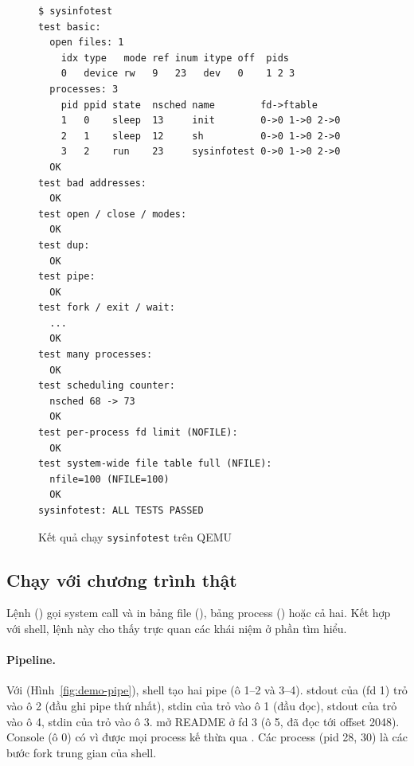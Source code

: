 \begin{figure}[H]
\begin{verbatim}
$ sysinfotest
test basic:
  open files: 1
    idx type   mode ref inum itype off  pids
    0   device rw   9   23   dev   0    1 2 3
  processes: 3
    pid ppid state  nsched name        fd->ftable
    1   0    sleep  13     init        0->0 1->0 2->0
    2   1    sleep  12     sh          0->0 1->0 2->0
    3   2    run    23     sysinfotest 0->0 1->0 2->0
  OK
test bad addresses:
  OK
test open / close / modes:
  OK
test dup:
  OK
test pipe:
  OK
test fork / exit / wait:
  ...
  OK
test many processes:
  OK
test scheduling counter:
  nsched 68 -> 73
  OK
test per-process fd limit (NOFILE):
  OK
test system-wide file table full (NFILE):
  nfile=100 (NFILE=100)
  OK
sysinfotest: ALL TESTS PASSED
\end{verbatim}
\caption{Kết quả chạy \texttt{sysinfotest} trên QEMU}
\label{fig:test-result}
\end{figure}

\subsection{Chạy với chương trình thật}
\label{sec:demo}

Lệnh  () gọi system call và in bảng
file (), bảng process () hoặc cả hai. Kết hợp với shell, lệnh
này cho thấy trực quan các khái niệm ở phần tìm hiểu.

\paragraph{Pipeline.}
Với  (Hình~\ref{fig:demo-pipe}), shell tạo
hai pipe (ô 1--2 và 3--4). stdout của  (fd 1) trỏ vào ô 2 (đầu ghi
pipe thứ nhất), stdin của  trỏ vào ô 1 (đầu đọc), stdout của
 trỏ vào ô 4, stdin của  trỏ vào ô 3.  mở
README ở fd 3 (ô 5, đã đọc tới offset 2048). Console (ô 0) có
 vì được mọi process kế thừa qua . Các process
 (pid 28, 30) là các bước fork trung gian của shell.

